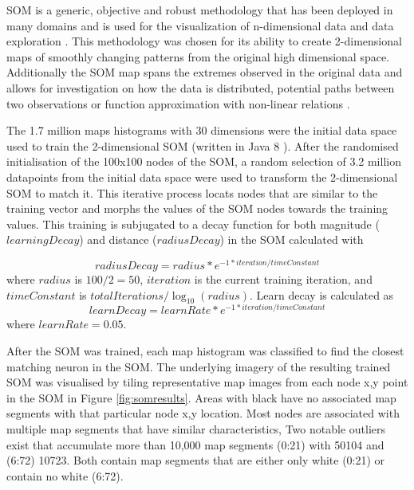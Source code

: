 \documentclass{nature}
\begin{document}
SOM is a generic, objective and robust methodology that has been deployed in many domains and is used for the visualization of n-dimensional data and data exploration \cite{Koleheimen2004}. This methodology was chosen for its ability to create 2-dimensional maps of smoothly changing patterns from the original high dimensional space. Additionally the SOM map spans the extremes observed in the original data and allows for investigation on how the data is distributed, potential paths between two observations or function approximation with non-linear relations \cite{Barreto2006}. 

The 1.7 million maps histograms with 30 dimensions were the initial data space used to train the 2-dimensional SOM (written in Java 8 \cite{Oracle2018}). After the randomised initialisation of the 100x100 nodes of the SOM, a random selection of 3.2 million datapoints from the initial data space were used to transform the 2-dimensional SOM to match it. This iterative process locats nodes that are similar to the training vector and morphs the values of the SOM nodes towards the training values. This training is subjugated to a decay function for both magnitude ($learningDecay$) and  distance ($radiusDecay$) in the SOM calculated with


\begin{equation} 
radiusDecay = radius * e^{-1 * iteration / timeConstant}
\end{equation}
where $radius$ is $100/2=50$, $iteration$ is the current training iteration, and $timeConstant$ is $totalIterations / \log _{10} (radius)$. Learn decay is calculated as
\begin{equation} 
learnDecay = learnRate * e^{-1 * iteration / timeConstant}
\end{equation}
where $learnRate = 0.05$.

After the SOM was trained, each map histogram was classified to find the closest matching neuron in the SOM. The underlying imagery of the resulting trained SOM was visualised by tiling representative map images from each node x,y point in the SOM in Figure \ref{fig:somresults}. Areas with black have no associated map segments with that particular node x,y location. Most nodes are associated with multiple map segments that have similar characteristics, %
Two notable outliers exist that accumulate more than 10,000 map segments (0:21) with 50104 and (6:72) 10723. Both contain map segments that are either only white (0:21) or contain no white (6:72).
\end{document}
